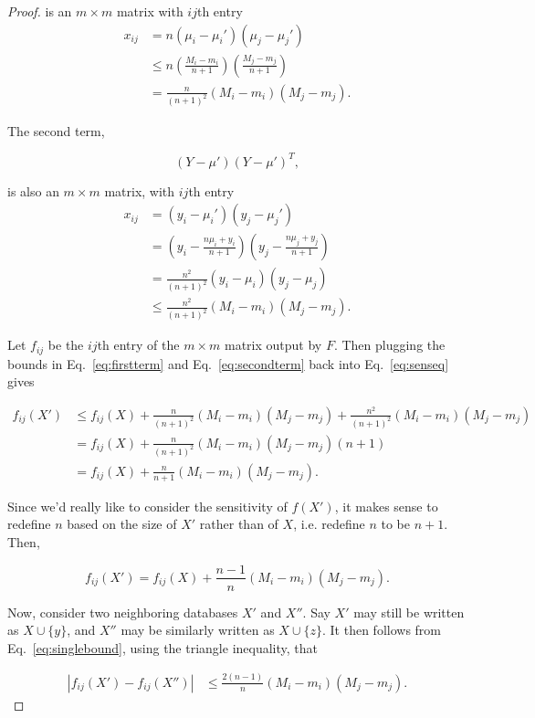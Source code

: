\documentclass[11pt, oneside]{article}   	%
\begin{document}
\begin{proof}
is an $m \times m$ matrix with $ij$th entry
\begin{align}
x_{ij} &= n(\mu_i - \mu_i')(\mu_j - \mu_j') \nonumber \\
	&\le n\left(\frac{M_i - m_i}{n+1}\right)\left(\frac{M_j - m_j}{n+1}\right) \nonumber \\
	&= \frac{n}{(n+1)^2} (M_i-m_i)(M_j-m_j).
\label{eq:firstterm}
\end{align}

The second term, 

$$ (Y-\mu')(Y-\mu')^T, $$

is also an $m \times m$ matrix, with $ij$th entry
\begin{align}
x_{ij} &= (y_i - \mu_i') (y_j - \mu_j') \nonumber\\
	&= \left( y_i - \frac{n\mu_i + y_i}{n+1} \right)\left( y_j - \frac{n\mu_j + y_j}{n+1} \right) \nonumber\\
	&= \frac{n^2}{(n+1)^2}(y_i - \mu_i)(y_j - \mu_j) \nonumber\\
	&\le \frac{n^2}{(n+1)^2}(M_i - m_i)(M_j - m_j).
\label{eq:secondterm}
\end{align}

Let $f_{ij}$ be the $ij$th entry of the $m\times m$ matrix output by $F$. Then plugging the bounds in Eq.~\ref{eq:firstterm} and Eq.~\ref{eq:secondterm} back into Eq.~\ref{eq:senseq} gives

\begin{align}
f_{ij}(X') &\le f_{ij}(X) + \frac{n}{(n+1)^2} (M_i-m_i)(M_j-m_j) + \frac{n^2}{(n+1)^2}(M_i - m_i)(M_j - m_j) \nonumber \\
&= f_{ij}(X) +\frac{n}{(n+1)^2}(M_i - m_i)(M_j - m_j)(n+1) \nonumber\\
&= f_{ij}(X) + \frac{n}{n+1}(M_i - m_i)(M_j - m_j).
\end{align}

Since we'd really like to consider the sensitivity of $f(X')$, it makes sense to redefine $n$ based on the size of $X'$ rather than of $X$, i.e. redefine $n$ to be $n+1$. Then,

\begin{equation}
f_{ij}(X') = f_{ij}(X) + \frac{n-1}{n}(M_i - m_i)(M_j - m_j).
\label{eq:singlebound}
\end{equation}

Now, consider two neighboring databases $X'$ and $X''$. Say $X'$ may still be written as $X \cup \{y\}$, and $X''$ may be similarly written as $X \cup \{z\}.$ It then follows from Eq.~\ref{eq:singlebound}, using the triangle inequality, that

\begin{align*}
\left\vert f_{ij}(X')-f_{ij}(X'') \right\vert &\le \frac{2(n-1)}{n}(M_i - m_i)(M_j - m_j).
\end{align*}


\end{proof}
\end{document}
